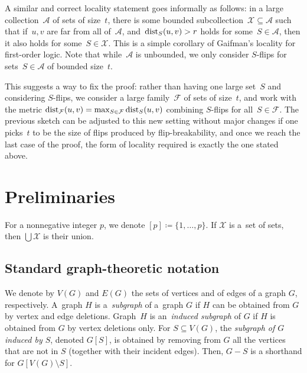 \documentclass[a4paper,UKenglish,cleveref, autoref, thm-restate]{lipics-v2021}
\newcommand{\XX}{\mathcal{X}}
\newcommand{\dist}{\textnormal{dist}}
\newcommand{\FF}{\mathcal{F}}
\begin{document}
A similar and correct locality statement goes informally as follows:
in a large collection~$\mathcal{A}$ of sets of size~$t$, there is some bounded subcollection~$\XX \subseteq \mathcal{A}$ such that
if~$u,v$ are far from all of~$\mathcal{A}$, and~$\dist_S(u,v) > r$ holds for some~$S \in \mathcal{A}$, then it also holds for some~$S \in \XX$.
This is a simple corollary of Gaifman's locality for first-order logic.
Note that while~$\mathcal{A}$ is unbounded, we only consider $S$-flips for sets~$S \in \mathcal{A}$ of bounded size~$t$.

This suggests a way to fix the proof:
rather than having one large set~$S$ and considering \mbox{$S$-flips}, we consider a large family~$\FF$ of sets of size~$t$, and work with the metric $\dist_\FF(u,v) = \max_{S \in \FF} \dist_S(u,v)$ combining $S$-flips for all~$S \in \FF$.
The previous sketch can be adjusted to this new setting without major changes if one picks~$t$ to be the size of flips produced by flip-breakability, and once we reach the last case of the proof, the form of locality required is exactly the one stated above.



















 
\section{Preliminaries}\label{sec:prelims}

For a nonnegative integer $p$, we denote $[p]\coloneqq\{1, \ldots, p\}$.
If $\mathcal X$ is a~set of sets, then $\bigcup \mathcal X$ is their union.

\subsection{Standard graph-theoretic notation}

We denote by $V(G)$ and $E(G)$ the sets of vertices and of edges of a graph $G$, respectively.
A~graph $H$ is a~\emph{subgraph} of a~graph $G$ if $H$ can be obtained from $G$ by vertex and edge deletions.
Graph~$H$ is an~\emph{induced subgraph} of $G$ if $H$ is obtained from $G$ by vertex deletions only.
For $S \subseteq V(G)$, the \emph{subgraph of $G$ induced by $S$}, denoted $G[S]$, is obtained by removing from $G$ all the vertices that are not in $S$ (together with their incident edges).
Then, $G-S$ is a shorthand for $G[V(G)\setminus S]$.
\end{document}
